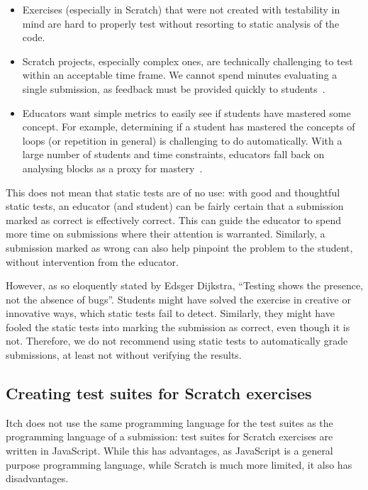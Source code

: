 \documentclass[../main]{subfiles}
\begin{document}
\begin{itemize}
    \item Exercises (especially in Scratch) that were not created with testability in mind are hard to properly test without resorting to static analysis of the code.
    \item Scratch projects, especially complex ones, are technically challenging to test within an acceptable time frame.
        We cannot spend minutes evaluating a single submission, as feedback must be provided quickly to students~\autocite{sarsaSpeedingAutomatedAssessment2022}.
    \item Educators want simple metrics to easily see if students have mastered some concept.
          For example, determining if a student has mastered the concepts of loops (or repetition in general) is challenging to do automatically.
          With a large number of students and time constraints, educators fall back on analysing blocks as a proxy for mastery~\autocite{combefisAutomatedCodeAssessment2022}.
\end{itemize}

This does not mean that static tests are of no use: with good and thoughtful static tests, an educator (and student) can be fairly certain that a submission marked as correct is effectively correct.
This can guide the educator to spend more time on submissions where their attention is warranted.
Similarly, a submission marked as wrong can also help pinpoint the problem to the student, without intervention from the educator.

However, as so eloquently stated by Edsger Dijkstra, ``Testing shows the presence, not the absence of bugs''.
Students might have solved the exercise in creative or innovative ways, which static tests fail to detect.
Similarly, they might have fooled the static tests into marking the submission as correct, even though it is not.
Therefore, we do not recommend using static tests to automatically grade submissions, at least not without verifying the results.

\subsection{Creating test suites for Scratch exercises}\label{subsec:creating-test-suites-for-scratch-exercises}

Itch does not use the same programming language for the test suites as the programming language of a submission: test suites for Scratch exercises are written in JavaScript.
While this has advantages, as JavaScript is a general purpose programming language, while Scratch is much more limited, it also has disadvantages.
\end{document}
